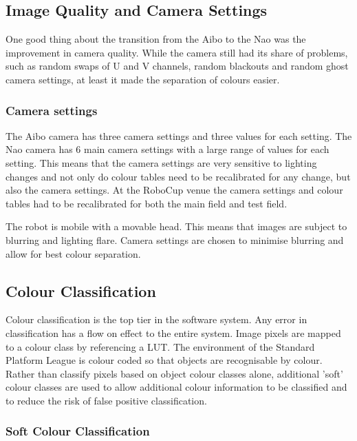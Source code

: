 

\subsection{Image Quality and Camera Settings}
One good thing about the transition from the Aibo to the Nao was the improvement in camera quality. While the camera still had its share of problems, such as random swaps of U and V channels, random blackouts and random ghost camera settings, at least it made the separation of colours easier.

\subsubsection{Camera settings}

The Aibo camera has three camera settings and three values for each setting. The Nao camera has 6 main camera settings with a large range of values for each setting. This means that the camera settings are very sensitive to lighting changes and not only do colour tables need to be recalibrated for any change, but also the camera settings. At the RoboCup venue the camera settings and colour tables had to be recalibrated for both the main field and test field. 

The robot is mobile with a movable head. This means that images are subject to blurring and lighting flare. Camera settings are chosen to minimise blurring and allow for best colour separation.

\subsection{Colour Classification}

Colour classification is the top tier in the software system. Any error in classification has a flow on effect to the entire system. Image pixels are mapped to a colour class by referencing a LUT. The environment of the Standard Platform League is colour coded so that objects are recognisable by colour. Rather than classify pixels based on object colour classes alone, additional 'soft' colour classes are used to allow additional colour information to be classified and to reduce the risk of false positive classification.

\subsubsection{Soft Colour Classification}

